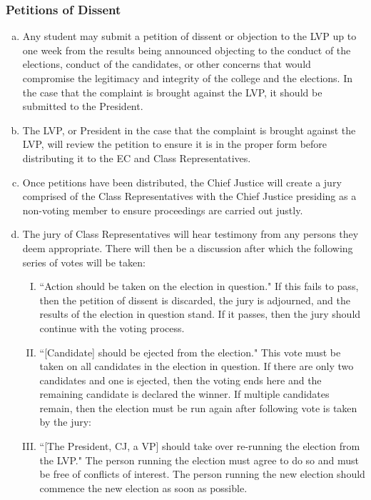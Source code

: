 \documentclass[USletter,12pt]{article}
\begin{document}
\begin{enumerate}[(a)]
\subsubsection{Petitions of Dissent}
\begin{enumerate}[(a)]
\item Any student may submit a petition of dissent or objection to the LVP up to one week from the results being announced objecting to the conduct of the elections, conduct of the candidates, or other concerns that would compromise the legitimacy and integrity of the college and the elections.  In the case that the complaint is brought against the LVP, it should be submitted to the President.  
\item The LVP, or President in the case that the complaint is brought against the LVP, will review the petition to ensure it is in the proper form before distributing it to the EC and Class Representatives.
\item Once petitions have been distributed, the Chief Justice will create a jury comprised of the Class Representatives with the Chief Justice presiding as a non-voting member to ensure proceedings are carried out justly.
\item The jury of Class Representatives will hear testimony from any persons they deem appropriate.  There will then be a discussion after which the following series of votes will be taken:
	\begin{enumerate}[(I)]
	\item ``Action should be taken on the election in question."  If this fails to pass, then the petition of dissent is discarded, the jury is adjourned, and the results of the election in question stand.  If it passes, then the jury should continue with the voting process.
	\item ``[Candidate] should be ejected from the election."  This vote must be taken on all candidates in the election in question.  If there are only two candidates and one is ejected, then the voting ends here and the remaining candidate is declared the winner.  If multiple candidates remain, then the election must be run again after following vote is taken by the jury:
	\item ``[The President, CJ, a VP] should take over re-running the election from the LVP."  The person running the election must agree to do so and must be free of conflicts of interest.  The person running the new election should commence the new election as soon as possible.
	\end{enumerate}
\end{enumerate}



\end{enumerate}
\end{document}
